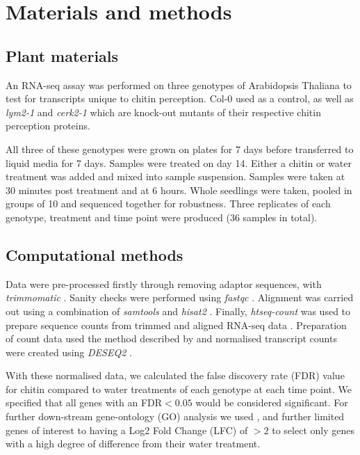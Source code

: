 \documentclass[../main.tex]{subfiles}
\begin{document}
\section{Materials and methods}

\subsection{Plant materials}
An RNA-seq assay was performed on three genotypes of Arabidopsis Thaliana to
test for transcripts unique to chitin perception. Col-0 used as a control,
as well as \textit{lym2-1} and \textit{cerk2-1} which are knock-out mutants of
their respective chitin perception proteins. 

All three of these genotypes were grown on plates for 7 days before transferred
to liquid media for 7 days. Samples were treated on day 14. Either a chitin or
water treatment was added and mixed into sample suspension. Samples were taken
at 30 minutes post treatment and at 6 hours. Whole seedlings were taken, pooled
in groups of 10 and sequenced together for robustness. Three replicates of each
genotype, treatment and time point were produced (36 samples in total).


\subsection{Computational methods}

Data were pre-processed firstly through removing adaptor sequences, with
\textit{trimmomatic} \cite{bolgerTrimmomaticFlexibleTrimmer2014}. Sanity checks
were performed using \textit{fastqc} \cite{andrewsBabrahamBioinformaticsFastQC}.
Alignment was carried out using a combination of \textit{samtools} and
\textit{hisat2} \cite{liSequenceAlignmentMap2009}. Finally, \textit{htseq-count}
was used to prepare sequence counts from trimmed and aligned RNA-seq data
\cite{kimHISATFastSpliced2015}. Preparation of count data used the method
described by \citet{loveModeratedEstimationFold2014a} and normalised transcript
counts were created using \textit{DESEQ2}
\cite{piperCountNormalizationDESeq22017}.

With these normalised data, we calculated the false discovery rate (FDR) value
for chitin compared to water treatments of each genotype at each time point. We
specified that all genes with an FDR$< 0.05$ would be considered significant.
For further down-stream gene-ontology (GO) analysis we used
\cite{klopfensteinGOATOOLSPythonLibrary2018}, and further limited genes of
interest to having a Log2 Fold Change (LFC) of $>2$ to select only genes with a
high degree of difference from their water treatment.
\end{document}
